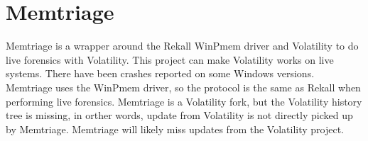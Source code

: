 \section[Memtriage]{Memtriage}

Memtriage \cite{memtriage} is a wrapper around the Rekall WinPmem driver and
Volatility to do live forensics with Volatility.  This project can make
Volatility works on live systems. There have been crashes reported on some
Windows versions.  Memtriage uses the WinPmem driver, so the protocol is the
same as Rekall when performing live forensics. Memtriage is a Volatility fork,
but the Volatility history tree is missing, in orther words, update from
Volatility is not directly picked up by Memtriage. Memtriage will likely miss
updates from the Volatility project.
